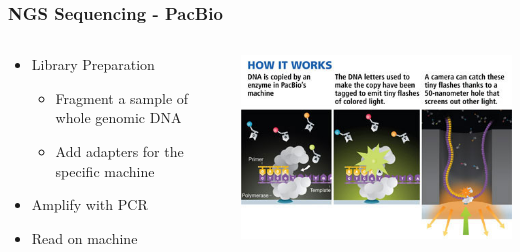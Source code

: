 \documentclass[14pt]{beamer}
\begin{document}
\begin{frame}
\frametitle{NGS Sequencing - PacBio}
\begin{columns}
	\begin{column}{0.5\textwidth}
		\begin{itemize}
			\item Library Preparation
			\begin{itemize}
				\item Fragment a sample of whole genomic DNA
				\item Add adapters for the specific machine
			\end{itemize}
			\item Amplify with PCR
			\item Read on machine
		\end{itemize}
	\end{column}
	\begin{column}{0.5\textwidth}
    	\begin{center}
     		\includegraphics[width=1\textwidth]{images_20170905_pacbio.jpg}
     	\end{center}
		\end{column}
	\end{columns}
\end{frame}
\end{document}
